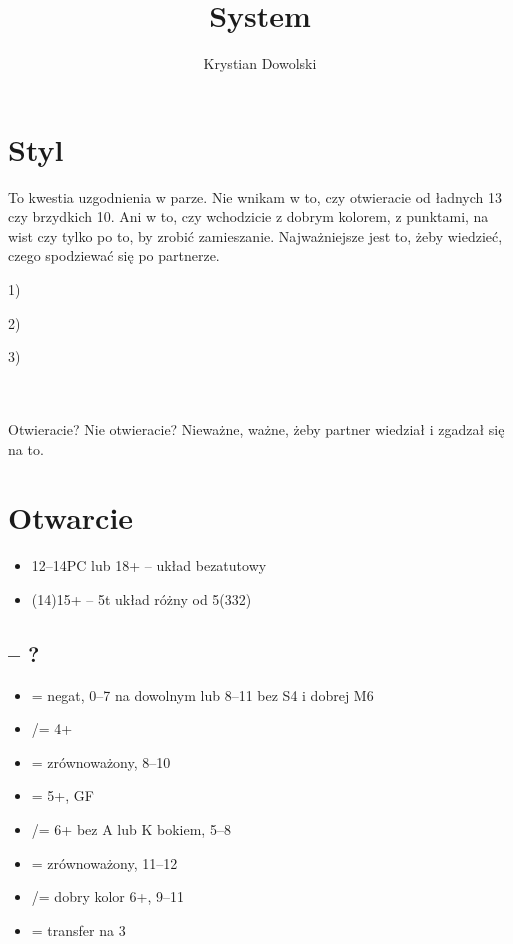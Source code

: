 \documentclass[12pt]{article}
\title{System}
\author{Krystian Dowolski}
\begin{document}
\tableofcontents
\newpage

\section{Styl}
To kwestia uzgodnienia w parze. Nie wnikam w to, czy otwieracie od ładnych 13 czy brzydkich 10. Ani w to, czy wchodzicie z dobrym kolorem, z punktami, na wist czy tylko po to, by zrobić zamieszanie. Najważniejsze jest to, żeby wiedzieć, czego spodziewać się po partnerze.

\vspace*{0.7cm}
1)
\begin{minipage}[t]{0.25\textwidth}
\end{minipage}%
2)
\begin{minipage}[t]{0.25\textwidth}
\end{minipage}%
3)
\begin{minipage}[t]{0.25\textwidth}
\end{minipage}%
\\\\
Otwieracie? Nie otwieracie? Nieważne, ważne, żeby partner wiedział i zgadzał się na to.
\newpage
\section{Otwarcie \texorpdfstring{\Cs[1]}{1C}}
\begin{itemize}
    \item 12–14PC lub 18+ – układ bezatutowy
    \item (14)15+  – 5t układ różny od 5(332)
\end{itemize}
\subsection{\texorpdfstring{\Cs[1] – ?}{1C - ?}}
\begin{itemize}
    \item \Ds[1] = negat, 0–7 na dowolnym lub 8–11 bez S4 i dobrej M6
    \item \Hs[1]/\Ss[] = 4+
    \item \NT[1] = zrównoważony, 8–10
    \item \Cs[2] = 5+\Cs, GF
    \item \Hs[2]/\Ss = 6+ bez A lub K bokiem, 5–8
    \item \NT[2] = zrównoważony, 11–12
    \item \Cs[3]/\Ds = dobry kolor 6+, 9–11
    \item \Ss[3] = transfer na 3\NT
\end{itemize}
\newpage
\end{document}
